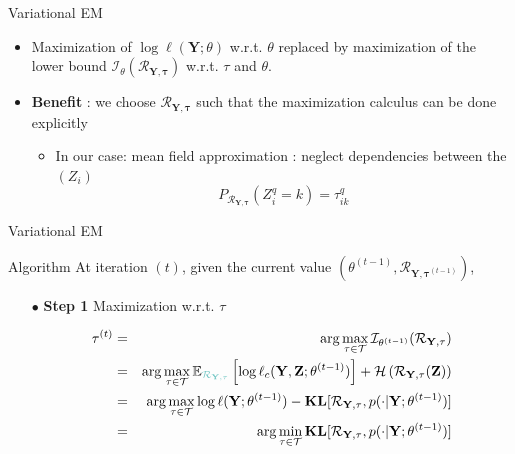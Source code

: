 \documentclass[compress,10pt]{beamer}
\newcommand{\bX}{\mathbf{Y}}
\newcommand{\Xall}{\mathbf{Y}}
\newcommand{\btau}{\mathbf{\tau}}
\newcommand{\bZ}{\mathbf{Z}}
\begin{document}
 \begin{frame}{Variational EM }
 

\begin{itemize}
\item Maximization of  $\log \ell(\Xall ; \theta)$  w.r.t.  $\theta$ replaced by maximization of the lower bound $\mathcal{I}_{\theta}(\mathcal{R}_{\Xall,\btau}) $  w.r.t.  $\tau$ and $\theta$. 
\item \textbf{Benefit} : we choose   $\mathcal{R}_{\Xall,\btau}$  such that the maximization calculus can be done explicitly
 \begin{itemize}
 \item In our case: mean field approximation : neglect dependencies between the  $(Z_i)$ 
 $$P_{\mathcal{R}_{\Xall,\btau}}(Z^q_i=k) = \tau_{ik}^q$$
  \end{itemize}



 \end{itemize}
  \end{frame}
 \begin{frame}{Variational  EM}


\begin{block}{Algorithm}
 \noindent At iteration $(t)$, given the current value  $(\theta^{(t-1)},\mathcal{R}_{\Xall, \btau^{(t-1)}})$,
\begin{enumerate}
\item[$\bullet$]\textbf{Step 1} Maximization w.r.t. $\tau$

\begin{eqnarray*}
\btau^{(t)}  &=&  \arg \max_{\btau  \in \mathcal{T}}  \mathcal{I}_{\theta^{(t-1)}}(\mathcal{R}_{\Xall,\btau})\\
 &=&  \arg \max_{\btau  \in \mathcal{T}}   \mathbb{E}_{\color{dgreen}\mathcal{R}_{\Xall,\btau}} \left[\log \ell_c(\bX,\bZ;  \theta^{(t-1)})   \right] +  \mathcal{H}\left(\mathcal{R}_{\Xall,\btau}(\bZ)\right) \\
&=&  \arg \max_{\btau  \in \mathcal{T}}  \log \ell(\Xall ; \theta^{(t-1)})  -  \mathbf{KL}[\mathcal{R}_{\Xall, \btau}, p(\cdot | \Xall; \theta^{(t-1)})]\\ 
&=& \arg \min_{\btau  \in \mathcal{T}}\mathbf{KL}[\mathcal{R}_{\Xall, \btau}, p(\cdot | \Xall; \theta^{(t-1)})]\\ 
 \end{eqnarray*}
 \end{enumerate}

 \end{block} 
 \end{frame}
\end{document}
